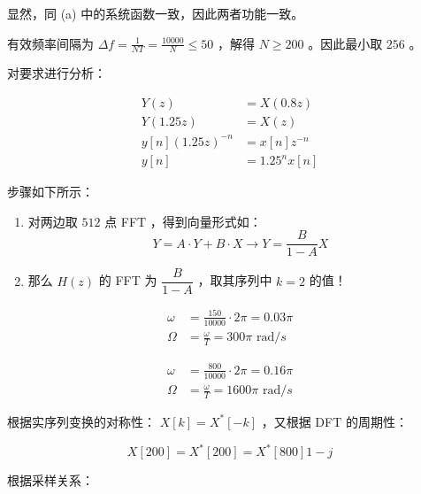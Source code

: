 \documentclass[lang=cn,11pt,a4paper,cite=authoryear, twocolumn]{elegantpaper}
\begin{document}
显然，同 (a) 中的系统函数一致，因此两者功能一致。



有效频率间隔为 \(\Delta f = \frac{1}{NT} = \frac{10000}{N} \leq 50\) ，解得 \(N \geq 200\) 。因此最小取 \(256\) 。


对要求进行分析：

\[\begin{aligned}
    Y(z) &= X(0.8 z) \\ 
    Y(1.25 z) &= X(z) \\ 
    y[n] (1.25 z)^{-n} &= x[n] z^{-n} \\
    y[n] &= 1.25^n x[n]
\end{aligned}\] 


步骤如下所示：

\begin{enumerate}
    \item 对两边取 \(512\) 点 FFT ，得到向量形式如： 
    \[Y = A \cdot Y + B \cdot X \rightarrow Y = \frac{B}{1-A} X \]  
    \item 那么 \(H(z)\) 的 FFT 为 \(\dfrac{B}{1-A}\) ，取其序列中 \(k = 2\) 的值！
\end{enumerate}




\[\begin{aligned}
    \omega &= \frac{150}{10000}\cdot 2\pi = 0.03 \pi \\ 
    \Omega &= \frac{\omega}{T} = 300 \pi \text{ rad} / s
\end{aligned}\]



\[\begin{aligned}
    \omega &= \frac{800}{10000}\cdot 2\pi = 0.16 \pi \\ 
    \Omega &= \frac{\omega}{T} = 1600 \pi \text{ rad} / s
\end{aligned}\]



根据实序列变换的对称性： \(X[k] = X^*[-k]\) ，又根据 DFT 的周期性：

\[X[200] = X^*[200] = X^*[800]1-j\] 


根据采样关系： 
\end{document}
